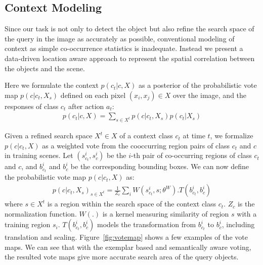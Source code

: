 


\subsection{Context Modeling}
\label{sec:context}
Since our task is not only to detect the object but also refine the search space of the query in the image as accurately as possible, conventional modeling of context as simple co-occurrence statistics is inadequate. Instead we present a data-driven location aware approach to represent the spatial correlation between the objects and the scene. 

Here we formulate the context $p(c_t|c,X)$ as a posterior of the probabilistic vote map $p(c|c_t,X_s)$ defined on each pixel $(x_i,x_j)\in X$ over the image, and the responses of class $c_t$ after action $a_t$:
\begin{eqnarray}
p(c_t|c,X) = \sum_{s\in X^t} p(c|c_t,X_s)p(c_t|X_s)
\end{eqnarray}

Given a refined search space $X^t\in X$ of a context class $c_t$ at time $t$, we formalize $p(c|c_t,X)$ as a weighted vote from the cooccurring region pairs of class $c_t$ and $c$ in training scenes. Let $(s_{c_t}^i, s_c^i)$ be the $i$-th pair of co-occurring regions of class $c_t$ and $c$, and $b_{c_t}^i$ and $b_c^i$ be the corresponding bounding boxes. We can now define the probabilistic vote map $p(c|c_t,X)$ as:
\begin{eqnarray}
\label{eq:votemap}
p(c|c_t,X_s)_{s\in X^t} = \frac{1}{Z_c}\sum_i W(s_{c_t}^i,s;\theta^W).T(b_{c_t}^i,b_c^i)
\end{eqnarray}
where $s\in X^t$ is a region within the search space of the context class $c_t$. $Z_c$ is the normalization function. $W(.)$ is a kernel measuring similarity of region $s$ with a training region $s_i$. $T(b_{c_t}^i,b_c^i)$ models the transformation from $b_{c_t}^i$ to $b_c^i$, including translation and scaling. Figure~\ref{fig:votemap} shows a few examples of the vote maps. We can see that with the exemplar based and semantically aware voting, the resulted vote maps give more accurate search area of the query objects.


